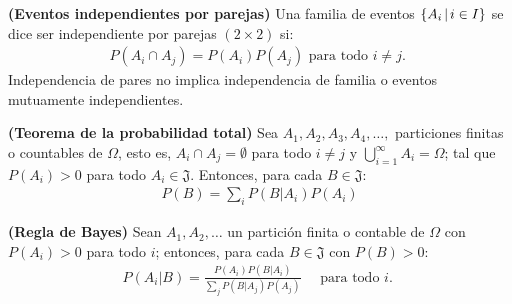 \begin{definition}{\bf (Eventos independientes por parejas)}
    \hspace{0.4mm}\newline
    Una familia de eventos $\{ A_i \hspace{0.5mm}|\hspace{0.5mm} i\in I\}$ se dice ser independiente por parejas $(2\times 2)$ si: 
    \begin{align*}
        P(A_i \cap A_j) = P(A_i)P(A_j) \text{ para todo $i\not= j$. }
    \end{align*}
    Independencia de pares no implica independencia de familia o eventos mutuamente independientes.
\end{definition}

\begin{theorem}{\bf (Teorema de la probabilidad total)}
    Sea $A_1, A_2, A_3, A_4, \ldots,$ particiones finitas o countables de $\Omega$, esto es, $A_i\cap A_j=\emptyset$ para todo  $i \not= j$
    y  $\bigcup_{i=1}^{\infty} A_i = \Omega$; tal que $P(A_i)> 0 $ para todo $A_i \in \mathfrak{J}$. Entonces, para cada $B\in \mathfrak{J}$:
    \begin{align}
        P(B) = \sum_{i} P(B|A_i)P(A_i)
    \end{align}
\end{theorem} 

\begin{corollary}{\bf (Regla de Bayes)}
    Sean $A_1,A_2, \ldots$ un partici\'on finita o contable de $\Omega$ con $P(A_i)>0$ para todo $i$; entonces, para cada $B\in \mathfrak{J}$ con $P(B)>0$:
    \begin{align}
        P(A_i | B) = \frac{P(A_i)P(B|A_i)}{\sum_j P(B|A_j)P(A_j)} \quad\text{ para todo $i$. }
    \end{align}
\end{corollary}



